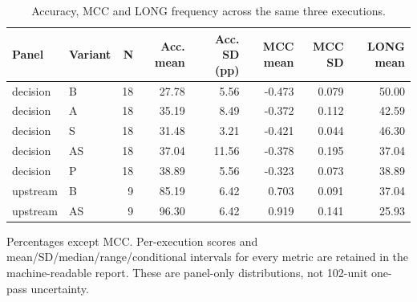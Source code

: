 \begin{table}[htbp]
\centering\small
\caption{Accuracy, MCC and LONG frequency across the same three executions.}
\label{tab:r3_classification}
\setlength{\tabcolsep}{3.5pt}
\begin{tabular}{llrrrrrr}
\hline
Panel & Variant & N & Acc. mean & Acc. SD (pp) & MCC mean & MCC SD & LONG mean \\
\hline
decision & B & 18 & 27.78 & 5.56 & -0.473 & 0.079 & 50.00 \\
decision & A & 18 & 35.19 & 8.49 & -0.372 & 0.112 & 42.59 \\
decision & S & 18 & 31.48 & 3.21 & -0.421 & 0.044 & 46.30 \\
decision & AS & 18 & 37.04 & 11.56 & -0.378 & 0.195 & 37.04 \\
decision & P & 18 & 38.89 & 5.56 & -0.323 & 0.073 & 38.89 \\
upstream & B & 9 & 85.19 & 6.42 & 0.703 & 0.091 & 37.04 \\
upstream & AS & 9 & 96.30 & 6.42 & 0.919 & 0.141 & 25.93 \\
\hline
\end{tabular}
\par\smallskip\footnotesize Percentages except MCC. Per-execution scores and mean/SD/median/range/conditional intervals for every metric are retained in the machine-readable report. These are panel-only distributions, not 102-unit one-pass uncertainty.
\end{table}
